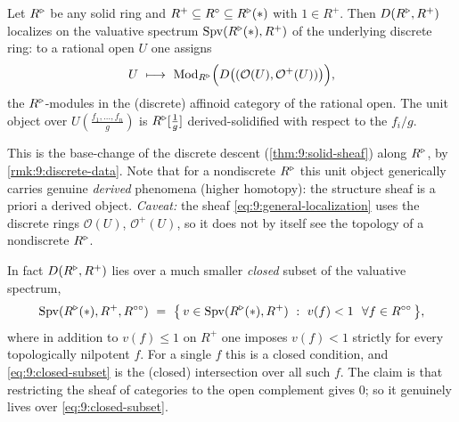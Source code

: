 \begin{corollary}
\label{cor:9:general-solid}
Let $R^{\triangleright}$ be any solid ring and $R^{+}\subseteq R^{\circ}\subseteq R^{\triangleright}(\ast)$
with $1\in R^{+}$. Then $D(R^{\triangleright},R^{+})$ localizes on the valuative spectrum
$\operatorname{Spv}(R^{\triangleright}(\ast),R^{+})$ of the underlying discrete ring: to a rational open
$U$ one assigns
\begin{equation}
\label{eq:9:general-localization}
U\ \longmapsto\ \operatorname{Mod}_{R^{\triangleright}}\Bigl(D\bigl((\mathcal O(U),\mathcal O^{+}(U))
\bigr)\Bigr),
\end{equation}
the $R^{\triangleright}$-modules in the (discrete) affinoid category of the rational open.
The unit object over $U(\tfrac{f_{1},\dots,f_{n}}{g})$ is $R^{\triangleright}[\tfrac1g]$
derived-solidified with respect to the $f_{i}/g$.
\end{corollary}

This is the base-change of the discrete descent (\cref{thm:9:solid-sheaf}) along
$R^{\triangleright}$, by \cref{rmk:9:discrete-data}. Note that for a nondiscrete $R^{\triangleright}$ this
unit object generically carries genuine \emph{derived} phenomena (higher
homotopy): the structure sheaf is a priori a derived object. \emph{Caveat:} the
sheaf \eqref{eq:9:general-localization} uses the discrete rings $\mathcal O(U)$,
$\mathcal O^{+}(U)$, so it does not by itself see the topology of a nondiscrete
$R^{\triangleright}$.

\begin{remark}
\label{rmk:9:closed-subset}
In fact $D(R^{\triangleright},R^{+})$ lies over a much smaller \emph{closed} subset of the
valuative spectrum,
\begin{equation}
\label{eq:9:closed-subset}
\operatorname{Spv}(R^{\triangleright}(\ast),R^{+},R^{\circ\circ})\ =\ \bigl\{\,v\in\operatorname{Spv}(R^{\triangleright}(\ast),R^{+})\
:\ v(f)<1\ \ \forall f\in R^{\circ\circ}\,\bigr\},
\end{equation}
where in addition to $v(f)\le 1$ on $R^{+}$ one imposes $v(f)<1$ strictly for
every topologically nilpotent $f$. For a single $f$ this is a closed condition,
and \eqref{eq:9:closed-subset} is the (closed) intersection over all such $f$.
The claim is that restricting the sheaf of categories to the open complement
gives $0$; so it genuinely lives over \eqref{eq:9:closed-subset}.
\end{remark}

